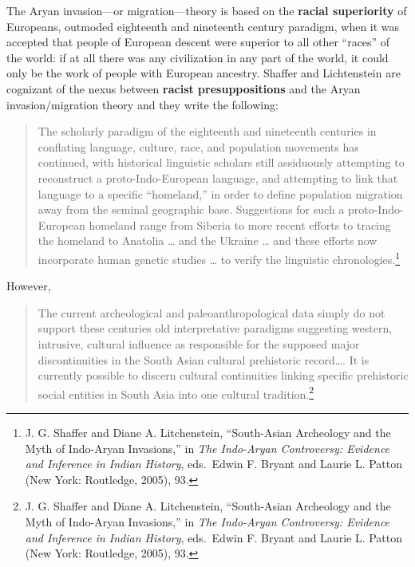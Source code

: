 \noindent
The Aryan invasion—or migration—theory is based on the \textbf{racial superiority} of Europeans, outmoded eighteenth and nineteenth century paradigm, when it was accepted that people of European descent were superior to all other “races” of the world: if at all there was any civilization in any part of the world, it could only be the work of people with European ancestry. Shaffer and Lichtenstein are cognizant of the nexus between \textbf{racist presuppositions} and the Aryan invasion/migration theory and they write the following: 

\begin{quote}
The scholarly paradigm of the eighteenth and nineteenth centuries in conflating language, culture, race, and population movements has continued, with historical linguistic scholars still assiduously attempting to reconstruct a proto-Indo-European language, and attempting to link that language to a specific “homeland,” in order to define population migration away from the seminal geographic base. Suggestions for such a proto-Indo-European homeland range from Siberia to more recent efforts to tracing the homeland to Anatolia … and the Ukraine … and these efforts now incorporate human genetic studies … to verify the linguistic chronologies.\footnote{J. G. Shaffer and Diane A. Litchenstein, “South-Asian Archeology and 	the Myth of Indo-Aryan Invasions,” in \textit{The Indo-Aryan Controversy: Evidence and Inference in Indian History}, eds.\ Edwin F. Bryant and Laurie L. Patton (New York: Routledge, 2005), 93.}
\end{quote}

\noindent
However,

\begin{quote}
The current archeological and paleoanthropological data simply do not support these centuries old interpretative paradigms suggesting western, intrusive, cultural influence as responsible for the supposed major discontinuities in the South Asian cultural prehistoric record…. It is currently possible to discern cultural continuities linking specific prehistoric social entities in South Asia into one cultural tradition.\footnote{J. G. Shaffer and Diane A. Litchenstein, “South-Asian Archeology and the Myth of Indo-Aryan Invasions,” in \textit{The Indo-Aryan Controversy: Evidence and Inference in Indian History}, eds.\ Edwin F. Bryant and Laurie L. Patton (New York: Routledge, 2005), 93.}
\end{quote}


